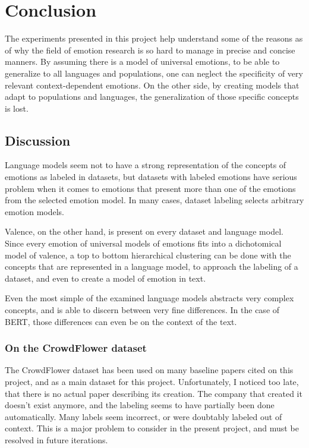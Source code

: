 \chapter{Conclusion}\label{chap:Conclusion}
The experiments presented in this project help understand some of the reasons as of why the field of emotion research is so hard to manage in precise and concise manners. By assuming there is a model of universal emotions, to be able to generalize to all languages and populations, one can neglect the specificity of very relevant context-dependent emotions. On the other side, by creating models that adapt to populations and languages, the generalization of those specific concepts is lost.

\section{Discussion}\label{sec:Discussion}
Language models seem not to have a strong representation of the concepts of emotions as labeled in datasets, but datasets with labeled emotions have serious problem when it comes to emotions that present more than one of the emotions from the selected emotion model. In many cases, dataset labeling selects arbitrary emotion models.

Valence, on the other hand, is present on every dataset and language model. Since every emotion of universal models of emotions fits into a dichotomical model of valence, a top to bottom hierarchical clustering can be done with the concepts that are represented in a language model, to approach the labeling of a dataset, and even to create a model of emotion in text.

Even the most simple of the examined language models abstracts very complex concepts, and is able to discern between very fine differences. In the case of BERT, those differences can even be on the context of the text.

\subsection{On the CrowdFlower dataset}
The CrowdFlower dataset has been used on many baseline papers cited on this project, and as a main dataset for this project. Unfortunately, I noticed too late, that there is no actual paper describing its creation. The company that created it doesn't exist anymore, and the labeling seems to have partially been done automatically. Many labels seem incorrect, or were doubtably labeled out of context. This is a major problem to consider in the present project, and must be resolved in future iterations.

